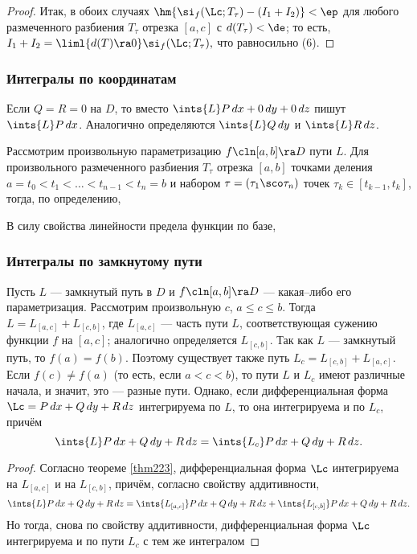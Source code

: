 \documentclass[a4paper]{article}
\begin{document}
\begin{proof}
Итак, в обоих случаях $\hm{\si_f(\Lc;T_{\tau})-(I_1+I_2)}<\ep$ для
любого размеченного разбиения $T_{\tau}$ отрезка $[a,c]$ с
$d(T_{\tau})<\de$; то есть, $I_1+I_2=\liml{d(T)\ra0}
\si_f(\Lc;T_{\tau}),$ что равносильно (6).
\end{proof}

\subsubsection{Интегралы по координатам}

Если $Q=R=0$ на $D$, то вместо $\ints{L} P\,dx+0\,dy+0\,dz$ пишут
$\ints{L}P\,dx$. Аналогично определяются $\ints{L} Q\,dy$ и
$\ints{L}R\,dz$.

Рассмотрим произвольную параметризацию $f\cln[a,b]\ra D$ пути $L$.
Для произвольного размеченного разбиения $T_{\tau}$ отрезка $[a,b]$
точками деления $a=t_0<t_1<\ldots<t_{n-1}<t_n=b$ и набором
$\tau=(\tau_1\sco\tau_n)$ точек $\tau_k\in[t_{k-1},t_k]$, тогда, по
определению,   

В силу свойства линейности предела функции по базе, 

\subsubsection{Интегралы по замкнутому пути}

Пусть $L$ --- замкнутый путь в $D$ и $f\cln[a,b]\ra D$ ---
какая--либо его параметризация. Рассмотрим произвольную $c$, $a \le
c \le b$. Тогда $L=L_{[a,c]} + L_{[c,b]}$, где $L_{[a,c]}$ --- часть
пути $L$, соответствующая сужению функции $f$ на $[a,c]$; аналогично
определяется $L_{[c,b]}$. Так как $L$ --- замкнутый путь, то
$f(a)=f(b)$. Поэтому существует также путь $L_c = L_{[c,b]} +
L_{[a,c]}$. Если $f(c)\ne f(a)$ (то есть, если $a<c<b$), то пути $L$
и $L_c$ имеют различные начала, и значит, это --- разные пути.
Однако, если дифференциальная форма $\Lc=P\,dx+Q\,dy+R\,dz$
интегрируема по $L$, то она интегрируема и по $L_c$, причём
$$\ints{L} P\,dx+Q\,dy+R\,dz=\ints{L_c} P\,dx+Q\,dy+R\,dz.$$

\begin{proof}
Согласно теореме \ref{thm223}, дифференциальная форма $\Lc$
интегрируема на $L_{[a,c]}$ и на $L_{[c,b]}$, причём, согласно
свойству аддитивности,
$$\ints{L}P\,dx+Q\,dy+R\,dz=\ints{L_{[a,c]}}P\,dx+Q\,dy+R\,dz +
\ints{L_{[c,b]}}P\,dx+Q\,dy+R\,dz.$$ Но тогда, снова по свойству
аддитивности, дифференциальная форма $\Lc$ интегрируема и по пути
$L_c$ с тем же интегралом 
\end{proof}
\end{document}
